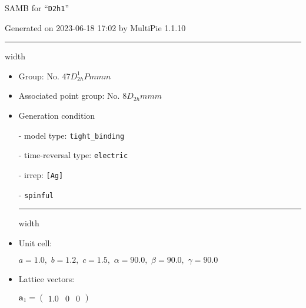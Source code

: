 \documentclass[fleqn,10pt,landscape]{article}
\begin{document}
\setcounter{MaxMatrixCols}{16}

\setlength{\baselineskip}{16pt}
\footnotesize
\begin{center}
\LARGE
SAMB for ``\texttt{D2h1}''
\end{center}
\begin{flushright}
Generated on 2023-06-18 17:02 by MultiPie 1.1.10
\end{flushright}
\vspace{1cm}


 \hfil \hrule height 1mm width \textwidth \hfil

\begin{itemize}
\item Group: No. 47\quad$D_{2h}^{1}$\quad$Pmmm$\quad[ orthorhombic ]

\item Associated point group: No. 8\quad$D_{2h}$\quad$mmm$\quad[ orthorhombic ]

\vspace{5mm}

\item Generation condition

\quad - model type: \texttt{tight_binding}

\quad - time-reversal type: \texttt{electric}

\quad - irrep: \texttt{[Ag]}

\quad - \texttt{spinful}


 \hfil \hrule height 1mm width \textwidth \hfil

\item Unit cell:

\quad $a=1.0,\,\, b=1.2,\,\, c=1.5,\,\, \alpha=90.0,\,\, \beta=90.0,\,\, \gamma=90.0$

\item Lattice vectors:

\quad $\bm{a}_1=\begin{pmatrix} 1.0 & 0 & 0 \end{pmatrix}$


\end{itemize}
\end{document}
